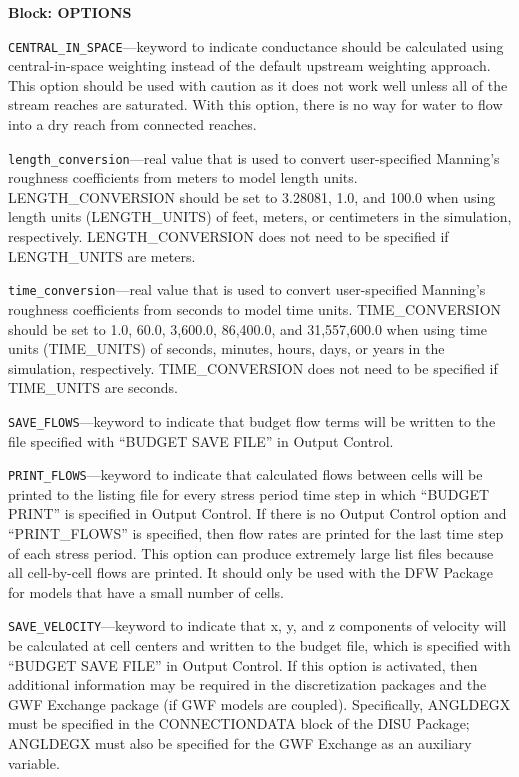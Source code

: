 
\item \textbf{Block: OPTIONS}

\begin{description}
\item \texttt{CENTRAL\_IN\_SPACE}---keyword to indicate conductance should be calculated using central-in-space weighting instead of the default upstream weighting approach.  This option should be used with caution as it does not work well unless all of the stream reaches are saturated.  With this option, there is no way for water to flow into a dry reach from connected reaches.

\item \texttt{length\_conversion}---real value that is used to convert user-specified Manning's roughness coefficients from meters to model length units. LENGTH\_CONVERSION should be set to 3.28081, 1.0, and 100.0 when using length units (LENGTH\_UNITS) of feet, meters, or centimeters in the simulation, respectively. LENGTH\_CONVERSION does not need to be specified if LENGTH\_UNITS are meters.

\item \texttt{time\_conversion}---real value that is used to convert user-specified Manning's roughness coefficients from seconds to model time units. TIME\_CONVERSION should be set to 1.0, 60.0, 3,600.0, 86,400.0, and 31,557,600.0 when using time units (TIME\_UNITS) of seconds, minutes, hours, days, or years in the simulation, respectively. TIME\_CONVERSION does not need to be specified if TIME\_UNITS are seconds.

\item \texttt{SAVE\_FLOWS}---keyword to indicate that budget flow terms will be written to the file specified with ``BUDGET SAVE FILE'' in Output Control.

\item \texttt{PRINT\_FLOWS}---keyword to indicate that calculated flows between cells will be printed to the listing file for every stress period time step in which ``BUDGET PRINT'' is specified in Output Control. If there is no Output Control option and ``PRINT\_FLOWS'' is specified, then flow rates are printed for the last time step of each stress period.  This option can produce extremely large list files because all cell-by-cell flows are printed.  It should only be used with the DFW Package for models that have a small number of cells.

\item \texttt{SAVE\_VELOCITY}---keyword to indicate that x, y, and z components of velocity will be calculated at cell centers and written to the budget file, which is specified with ``BUDGET SAVE FILE'' in Output Control.  If this option is activated, then additional information may be required in the discretization packages and the GWF Exchange package (if GWF models are coupled).  Specifically, ANGLDEGX must be specified in the CONNECTIONDATA block of the DISU Package; ANGLDEGX must also be specified for the GWF Exchange as an auxiliary variable.


\end{description}
